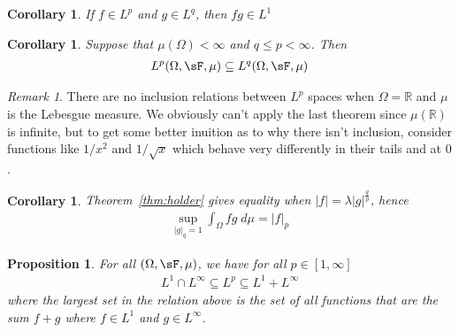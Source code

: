 \documentclass[12pt]{article}
\theoremstyle{plain}
\newtheorem{prop}[thm]{Proposition}
\newtheorem{cor}[thm]{Corollary}
\theoremstyle{definition}
\theoremstyle{remark}
\newtheorem*{rmk}{Remark}
\begin{document}
\begin{cor}
If $f\in L^p$ and $g\in L^{q}$, then $fg\in L^1$
\end{cor}

\begin{cor}
Suppose that $\mu(\Omega)<\infty$ and $q\leq p<\infty$. Then
\begin{align*}
  L^p(\Omega,\sF,\mu)
  \subseteq
  L^q(\Omega,\sF,\mu)
\end{align*}
\end{cor}
\begin{rmk}
There are no inclusion relations between $L^p$ spaces when
$\Omega=\mathbb{R}$ and $\mu$ is the Lebesgue measure. We obviously
can't apply the last theorem since $\mu(\mathbb{R})$ is infinite, but to
get some better inuition as to why there isn't inclusion, consider
functions like $1/x^2$ and $1/\sqrt{x}$ which behave very differently in
their tails and at $0$.
\end{rmk}

\begin{cor}
Theorem~\ref{thm:holder} gives equality when
$|f|=\lambda |g|^{\frac{q}{p}}$, hence
\begin{align*}
    \sup_{\lvert g\rvert_{q}=1}
    \int_\Omega fg \; d\mu = \lvert f\rvert_p
\end{align*}
\end{cor}

\begin{prop}
For all $(\Omega,\sF,\mu)$, we have for all $p\in[1,\infty]$
\begin{align*}
  L^1 \cap L^\infty \subseteq L^p \subseteq L^1+L^\infty
\end{align*}
where the largest set in the relation above is the set of all functions
that are the sum $f+g$ where $f\in L^1$ and $g\in L^\infty$.
\end{prop}
\end{document}
